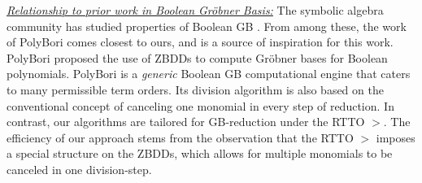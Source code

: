 \underline{\it Relationship to prior work in Boolean Gr\"obner Basis:}
The symbolic algebra community has studied properties of Boolean
GB \cite{michon:bool-ring2006} \cite{vardi-iasted07}
\cite{polybori:2009}. From among these, the work of PolyBori
\cite{polybori:2009} comes closest to ours, and is a source of
inspiration for this work. PolyBori proposed the use of ZBDDs to
compute Gr\"obner bases for Boolean polynomials. PolyBori is a {\it
  generic} Boolean GB computational engine that caters to many
permissible term orders. Its division algorithm is also based on the
conventional concept of canceling one monomial in every step of
reduction. In contrast, our algorithms are tailored for GB-reduction
under the RTTO $>$. The efficiency of our approach stems from the
observation that the RTTO $>$ imposes a special structure on the
ZBDDs, which allows for multiple monomials to be canceled in one
division-step. 


